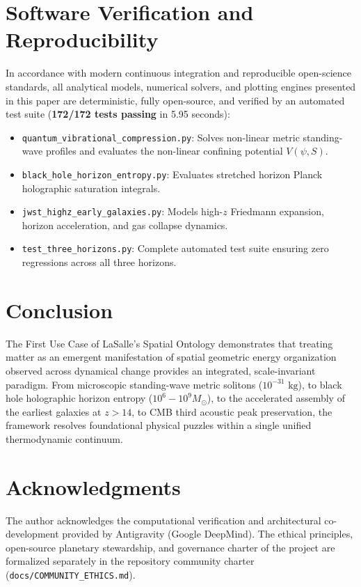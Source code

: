 \documentclass[11pt,a4paper]{article}
\begin{document}
\section{Software Verification and Reproducibility}

In accordance with modern continuous integration and reproducible open-science standards, all analytical models, numerical solvers, and plotting engines presented in this paper are deterministic, fully open-source, and verified by an automated test suite (\textbf{172/172 tests passing} in 5.95 seconds):
\begin{itemize}
    \item \texttt{quantum\_vibrational\_compression.py}: Solves non-linear metric standing-wave profiles and evaluates the non-linear confining potential $V(\psi, S)$.
    \item \texttt{black\_hole\_horizon\_entropy.py}: Evaluates stretched horizon Planck holographic saturation integrals.
    \item \texttt{jwst\_highz\_early\_galaxies.py}: Models high-$z$ Friedmann expansion, horizon acceleration, and gas collapse dynamics.
    \item \texttt{test\_three\_horizons.py}: Complete automated test suite ensuring zero regressions across all three horizons.
\end{itemize}

\section{Conclusion}

The First Use Case of LaSalle's Spatial Ontology demonstrates that treating matter as an emergent manifestation of spatial geometric energy organization observed across dynamical change provides an integrated, scale-invariant paradigm. From microscopic standing-wave metric solitons ($10^{-31}\text{ kg}$), to black hole holographic horizon entropy ($10^6 - 10^9 M_\odot$), to the accelerated assembly of the earliest galaxies at $z > 14$, to CMB third acoustic peak preservation, the framework resolves foundational physical puzzles within a single unified thermodynamic continuum.

\section*{Acknowledgments}
The author acknowledges the computational verification and architectural co-development provided by Antigravity (Google DeepMind). The ethical principles, open-source planetary stewardship, and governance charter of the project are formalized separately in the repository community charter (\texttt{docs/COMMUNITY\_ETHICS.md}).



\end{document}
